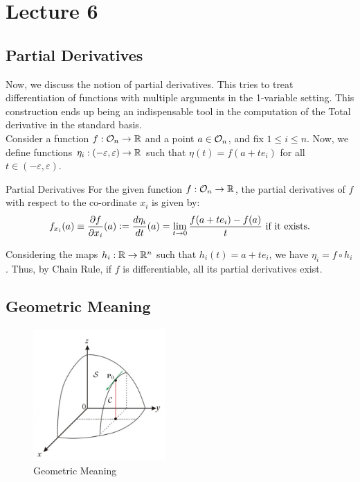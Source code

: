 \documentclass[../Analysis-3.tex]{subfiles}
\begin{document}
\chapter*{Lecture 6} %
\setcounter{chapter}{6} %
\setcounter{section}{0}
\setcounter{equation}{0}
\setcounter{figure}{0}


\section{Partial Derivatives}

Now, we discuss the notion of partial derivatives. This tries to treat differentiation of functions with multiple arguments in the 1-variable setting. This construction ends up being an indispensable tool in the computation of the Total derivative in the standard basis.\\[0.2 cm]

Consider a function $f:\mathcal{O}_{n} \rightarrow\mathbb{R}$ and a point $a \in \mathcal{O}_{n}$, and fix $1 \leq i \leq n$. Now, we define functions $\eta_i : (-\varepsilon, \varepsilon) \rightarrow \mathbb{R}$ such that $\eta(t) = f(a + te_i)$ for all $t \in (-\varepsilon, \varepsilon)$.

\begin{Def}{Partial Derivatives}{}
  For the given function $f:\mathcal{O}_{n} \rightarrow\mathbb{R}$, the partial derivatives of $f$ with respect to the co-ordinate $x_i$ is given by:
  \[
    f_{x_i}(a) \equiv \pdv{f}{x_i}\/(a) \mathrel{\mathop:}=  \frac{d\eta_i}{dt}(a) = \lim_{t \to 0} \frac{f(a+te_i) - f(a)}{t} \text{ if it exists.}
  \]
\end{Def}

Considering the maps $h_i : \mathbb{R} \to \mathbb{R}^n$ such that $h_i(t) = a + te_i$, we have $\eta_i = f \circ h_i$. Thus, by Chain Rule, if $f$ is differentiable, all its partial derivatives exist.

\section{Geometric Meaning}

\begin{figure}
  \centering
  \includegraphics[width=0.45\textwidth]{figures/lec6.1.png}
  \caption{Geometric Meaning}
  \label{fig1:6}
\end{figure}
\end{document}
